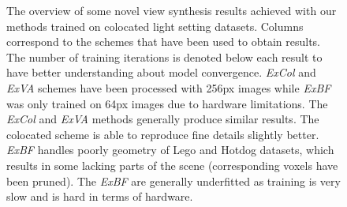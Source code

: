 \begin{figure}[!htb]
\begin{tabular*}{\textwidth}{ c c c c }
    \end{tabular*}
    \caption{The overview of some novel view synthesis results achieved with our methods trained on colocated light setting datasets.
    Columns correspond to the schemes that have been used to obtain results.
    The number of training iterations is denoted below each result to have better understanding about model convergence.
    \textit{ExCol} and \textit{ExVA} schemes have been processed with 256px images
    while \textit{ExBF} was only trained on 64px images due to hardware limitations.
    The \textit{ExCol} and \textit{ExVA} methods generally produce similar results.
    The colocated scheme is able to reproduce fine details slightly better.
    \textit{ExBF} handles poorly geometry of Lego and Hotdog datasets,
    which results in some lacking parts of the scene
    (corresponding voxels have been pruned).
    The \textit{ExBF} are generally underfitted as training is very slow and is hard in terms of hardware.}
    \label{tab:coloc_allresults}
\end{figure}
\endgroup